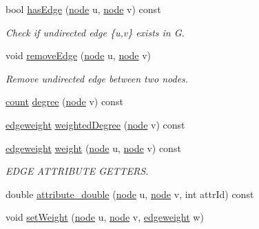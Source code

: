 \begin{DoxyCompactItemize}
bool \hyperlink{class_networ_kit_1_1_graph_a7a646fd6745ba9e7528170ff237232eb}{has\-Edge} (\hyperlink{namespace_networ_kit_a61914158fd771265be48de9942369160}{node} u, \hyperlink{namespace_networ_kit_a61914158fd771265be48de9942369160}{node} v) const 
\begin{DoxyCompactList}\small\item\em Check if undirected edge \{u,v\} exists in G. \end{DoxyCompactList}\item 
void \hyperlink{class_networ_kit_1_1_graph_a79d74bd437bf63f866a9da4ba11f270c}{remove\-Edge} (\hyperlink{namespace_networ_kit_a61914158fd771265be48de9942369160}{node} u, \hyperlink{namespace_networ_kit_a61914158fd771265be48de9942369160}{node} v)
\begin{DoxyCompactList}\small\item\em Remove undirected edge between two nodes. \end{DoxyCompactList}\item 
\hyperlink{namespace_networ_kit_ad4c536a5339a8bf2f91f418b9a67a7d8}{count} \hyperlink{class_networ_kit_1_1_graph_a7a9ae1841eed3ab10520f89d94a50539}{degree} (\hyperlink{namespace_networ_kit_a61914158fd771265be48de9942369160}{node} v) const 
\item 
\hyperlink{namespace_networ_kit_a831b108dbcd79dad062d9e28b1b4e3dd}{edgeweight} \hyperlink{class_networ_kit_1_1_graph_a48ace7ae9a931d69999d8fb55e563063}{weighted\-Degree} (\hyperlink{namespace_networ_kit_a61914158fd771265be48de9942369160}{node} v) const 
\item 
\hyperlink{namespace_networ_kit_a831b108dbcd79dad062d9e28b1b4e3dd}{edgeweight} \hyperlink{class_networ_kit_1_1_graph_a4cc21c97791b60088e735ef0c36583b8}{weight} (\hyperlink{namespace_networ_kit_a61914158fd771265be48de9942369160}{node} u, \hyperlink{namespace_networ_kit_a61914158fd771265be48de9942369160}{node} v) const 
\begin{DoxyCompactList}\small\item\em E\-D\-G\-E A\-T\-T\-R\-I\-B\-U\-T\-E G\-E\-T\-T\-E\-R\-S. \end{DoxyCompactList}\item 
double \hyperlink{class_networ_kit_1_1_graph_a91cffc25cb2af288ce098fb9c2fcb192}{attribute\-\_\-double} (\hyperlink{namespace_networ_kit_a61914158fd771265be48de9942369160}{node} u, \hyperlink{namespace_networ_kit_a61914158fd771265be48de9942369160}{node} v, int attr\-Id) const 
\item 
void \hyperlink{class_networ_kit_1_1_graph_ad56d4fada3895f8446e58d7cd33ca274}{set\-Weight} (\hyperlink{namespace_networ_kit_a61914158fd771265be48de9942369160}{node} u, \hyperlink{namespace_networ_kit_a61914158fd771265be48de9942369160}{node} v, \hyperlink{namespace_networ_kit_a831b108dbcd79dad062d9e28b1b4e3dd}{edgeweight} w)

\end{DoxyCompactItemize}
